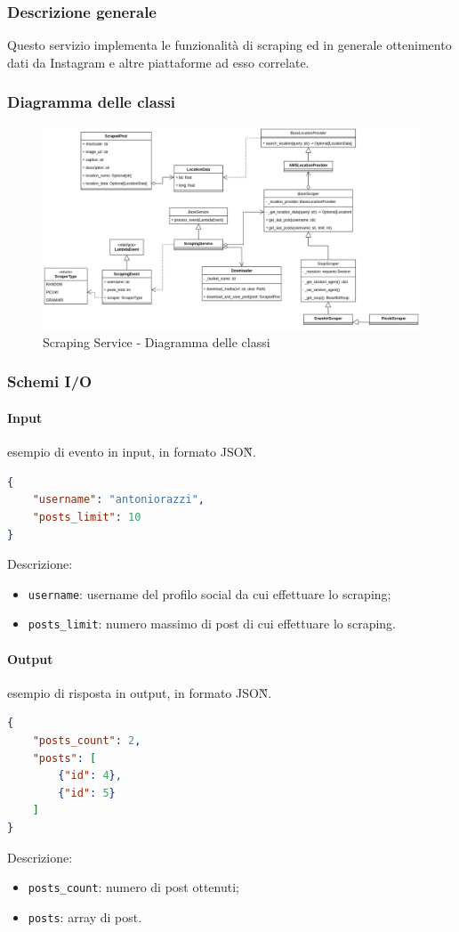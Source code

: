 \subsubsection{Descrizione generale}
Questo servizio implementa le funzionalità di scraping ed in generale ottenimento dati da Instagram e altre piattaforme ad esso correlate.

\subsubsection{Diagramma delle classi}
\begin{figure}[H]
    \includegraphics[width=14cm]{sezioni/images/cd_scraping.png}
    \centering
    \caption{Scraping Service - Diagramma delle classi}
\end{figure}

\subsubsection{Schemi I/O}
\paragraph*{Input} esempio di evento in input, in formato JSON\G{}.
\begin{lstlisting}[language=JSON]
{
    "username": "antoniorazzi",
    "posts_limit": 10
}
\end{lstlisting}
Descrizione:
\begin{itemize}
    \item \verb|username|: username del profilo social da cui effettuare lo scraping;
    \item \verb|posts_limit|: numero massimo di post di cui effettuare lo scraping. 
\end{itemize}

\paragraph*{Output} esempio di risposta in output, in formato JSON\G{}.
\begin{lstlisting}[language=JSON]
{
    "posts_count": 2,
    "posts": [
        {"id": 4},
        {"id": 5}
    ]
}
\end{lstlisting}
Descrizione:
\begin{itemize}
    \item \verb|posts_count|: numero di post ottenuti;
    \item \verb|posts|: array di post. 
\end{itemize}

